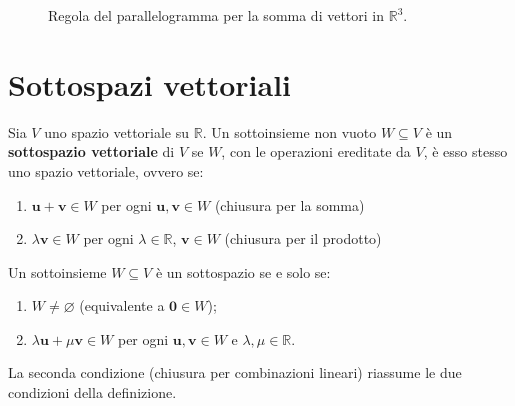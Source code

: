 \begin{figure}[htbp]
\centering
{}
\caption{Regola del parallelogramma per la somma di vettori in $\mathbb{R}^3$.}
\label{fig:somma-vettori}
\end{figure}

\section{Sottospazi vettoriali}
\label{sec:sottospazi}

\begin{definitionbox}
Sia $V$ uno spazio vettoriale su $\mathbb{R}$. Un sottoinsieme non vuoto $W \subseteq V$ è un \textbf{sottospazio vettoriale} di $V$ se $W$, con le operazioni ereditate da $V$, è esso stesso uno spazio vettoriale, ovvero se:
\begin{enumerate}
    \item $\mathbf{u} + \mathbf{v} \in W$ per ogni $\mathbf{u}, \mathbf{v} \in W$ \hfill (chiusura per la somma)
    \item $\lambda \mathbf{v} \in W$ per ogni $\lambda \in \mathbb{R}$, $\mathbf{v} \in W$ \hfill (chiusura per il prodotto)
\end{enumerate}
\end{definitionbox}

\begin{notebox}
Un sottoinsieme $W \subseteq V$ è un sottospazio se e solo se:
\begin{enumerate}
    \item $W \neq \varnothing$ (equivalente a $\mathbf{0} \in W$);
    \item $\lambda \mathbf{u} + \mu \mathbf{v} \in W$ per ogni $\mathbf{u}, \mathbf{v} \in W$ e $\lambda, \mu \in \mathbb{R}$.
\end{enumerate}
La seconda condizione (chiusura per combinazioni lineari) riassume le due condizioni della definizione.
\end{notebox}

